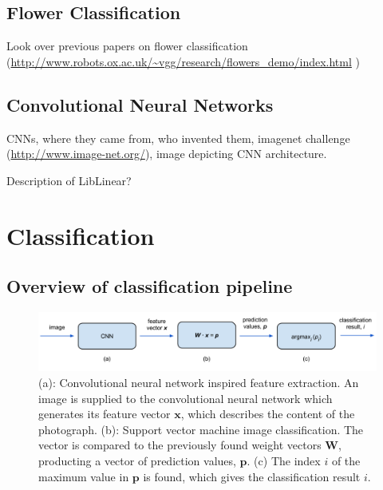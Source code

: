 \documentclass[11pt, a4paper]{report}
\newcommand{\vect}[1]{\boldsymbol{#1}}
\begin{document}
\section{Flower Classification}

Look over previous papers on flower classification (\url{http://www.robots.ox.ac.uk/~vgg/research/flowers_demo/index.html}	)

\section{Convolutional Neural Networks}

CNNs, where they came from, who invented them, imagenet challenge (\url{http://www.image-net.org/}), image depicting CNN architecture. 


Description of LibLinear?












\chapter{Classification}

\section{Overview of classification pipeline}

\begin{figure}[hbt]
	\centering
  \includegraphics[totalheight=3cm]{img/08.png}
  \caption{(a): Convolutional neural network inspired feature extraction. An image is supplied to the convolutional neural network which generates its feature vector $\vect{x}$, which describes the content of the photograph. (b): Support vector machine image classification. The vector is compared to the previously found weight vectors $\vect{W}$, producting a vector of prediction values, $\vect{p}$. (c) The index $i$ of the maximum value in $\vect{p}$ is found, which gives the classification result $i$.}
  \label{img:08}
\end{figure}
\end{document}
